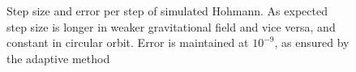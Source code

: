 \begin{figure}[ht!]
    \centering
        \caption{Step size and error per step of simulated Hohmann. As expected step size is longer in weaker gravitational field and vice versa, and constant in circular orbit. Error is maintained at $10^{-9}$, as ensured by the adaptive method}
        \label{fig:hohmann-step_error}
\end{figure}

